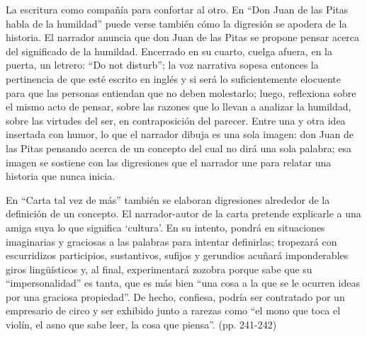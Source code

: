 \documentclass[14pt,twoside,final]{extbook} %
\begin{document}
La escritura como compañía para confortar al otro. En ``Don Juan de las Pitas habla de la humildad'' puede verse también cómo la digresión se apodera de la historia. El narrador anuncia que don Juan de las Pitas se propone pensar acerca del significado de la humildad. Encerrado en su cuarto, cuelga afuera, en la puerta, un letrero: ``Do not disturb''; la voz narrativa sopesa entonces la pertinencia de que esté escrito en inglés y si será lo suficientemente elocuente para que las personas entiendan que no deben molestarlo; luego, reflexiona sobre el mismo acto de pensar, sobre las razones que lo llevan a analizar la humildad, sobre las virtudes del ser, en contraposición del parecer. Entre una y otra idea insertada con humor, lo que el narrador dibuja es una sola imagen: don Juan de las Pitas pensando acerca de un concepto del cual no dirá una sola palabra; esa imagen se sostiene con las digresiones que el narrador une para relatar una historia que nunca inicia.

En ``Carta tal vez de más'' también se elaboran digresiones alrededor de la definición de un concepto. El narrador-autor de la carta pretende explicarle a una amiga suya lo que significa `cultura'. En su intento, pondrá en situaciones imaginarias y graciosas a las palabras para intentar definirlas; tropezará con escurridizos participios, sustantivos, sufijos y gerundios acuñará imponderables giros lingüísticos y, al final, experimentará zozobra porque sabe que su ``impersonalidad'' es tanta, que es más bien ``una cosa a la que se le ocurren ideas por una graciosa propiedad''. De hecho, confiesa, podría ser contratado por un empresario de circo y ser exhibido junto a rarezas como ``el mono que toca el violín, el asno que sabe leer, la cosa que piensa''. (pp. 241-242)
\end{document}

